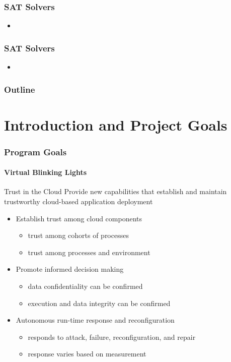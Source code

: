 \documentclass{beamer}
\begin{document}
\begin{frame}

 \frametitle{SAT Solvers}
 
 \begin{itemize}
 
 \item  
 
 \end{itemize}
 
\end{frame}

\begin{frame}

 \frametitle{SAT Solvers}
 
 \begin{itemize}
 
 \item  
 
 \end{itemize}
 
\end{frame}




\begin{frame}
  \frametitle{Outline}
  \tableofcontents
\end{frame}

\section{Introduction and Project Goals}

\begin{frame}
  \frametitle{Program Goals}
  \framesubtitle{Virtual Blinking Lights}
  \begin{block}{Trust in the Cloud}
    Provide new capabilities that establish and maintain trustworthy
    cloud-based application deployment
  \end{block}

  \begin{itemize}
  \item Establish trust among cloud components
    \begin{itemize}
    \item trust among cohorts of processes
    \item trust among processes and environment
    \end{itemize}
  \item Promote informed decision making
    \begin{itemize}
    \item data confidentiality can be confirmed
    \item execution and data integrity can be confirmed
    \end{itemize}
  \item Autonomous run-time response and reconfiguration
    \begin{itemize}
    \item responds to attack, failure, reconfiguration, and repair 
    \item response varies based on measurement
    \end{itemize}
  \end{itemize}
\end{frame}
\end{document}
